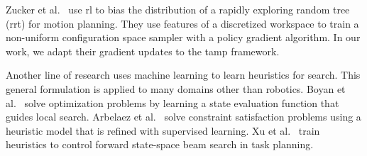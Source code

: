Zucker et al.~\cite{workspacebias} use {\sc rl} to bias the
distribution of a rapidly exploring random tree ({\sc rrt}) for motion
planning. They use features of a discretized workspace to train a
non-uniform configuration space sampler with a policy gradient
algorithm.  In our work, we adapt their gradient updates to the {\sc
  tamp} framework.

Another line of research uses machine learning to learn heuristics for
search. This general formulation is applied to many domains other than
robotics.  Boyan et al.~\cite{Boyanlearning} solve optimization
problems by learning a state evaluation function that guides local
search. Arbelaez et al.~\cite{hamadisearch} solve constraint
satisfaction problems using a heuristic model that is refined with
supervised learning. Xu et al.~\cite{Xu07discriminativelearning}
train heuristics to control forward state-space beam search in task
planning.
